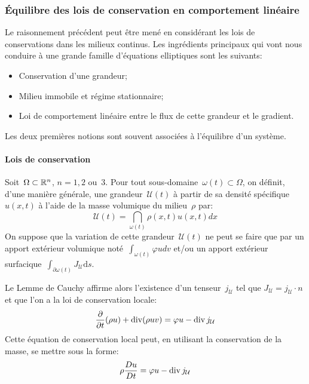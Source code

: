 \medskip
\subsubsection{Équilibre des lois de conservation en comportement linéaire}
Le raisonnement précédent peut être mené en considérant les lois de conservations dans les milieux continus. Les ingrédients principaux qui vont nous conduire à une grande famille d'équations elliptiques sont les suivants:
\begin{itemize}
  \item Conservation d'une grandeur;
  \item Milieu immobile et régime stationnaire;
  \item Loi de comportement linéaire entre le flux de cette grandeur et le gradient.
\end{itemize}
Les deux premières notions sont souvent associées à l'équilibre d'un système.

\medskip
\paragraph{Lois de conservation}
Soit~$\Omega\subset\mathbb R^n$, $n=1, 2$ ou~$3$.
Pour tout sous-domaine~$\omega(t)\subset\Omega$, on définit, d'une manière générale, une grandeur~$\mathcal{U}(t)$ à partir de sa densité spécifique $u(x,t)$ à l'aide de la masse volumique du milieu~$\rho$ par:
\begin{equation}\mathcal{U}(t)=\dint_{\omega(t)} \rho(x,t)u(x,t)dx\end{equation}
On suppose que la variation de cette grandeur~$\mathcal{U}(t)$ ne peut se faire que par un apport extérieur volumique noté~$\int_{\omega(t)} \varphi u dv$ et/ou un apport extérieur surfacique~$\int_{\partial\omega(t)} J_{\mathcal{U}} \mathrm ds$.

Le Lemme de Cauchy affirme alors l'existence d'un tenseur~$j_{\mathcal{U}}$ tel que $J_{\mathcal{U}} = j_{\mathcal{U}}\cdot n$ et que l'on a la loi de conservation locale:
\begin{equation}\dfrac\partial{\partial t}(\rho u) + \operatorname{div} (\rho uv) = \varphi u-\operatorname{div} j_{\mathcal{U}}
\end{equation}
Cette équation de conservation local peut, en utilisant la conservation de la masse, se mettre sous la forme:
\begin{equation}
\rho \dfrac{Du}{Dt} = \varphi u-\operatorname{div} j_{\mathcal{U}}
\end{equation}

\medskip
